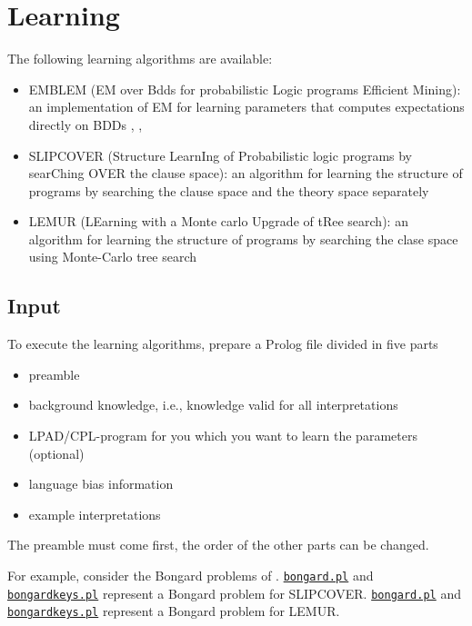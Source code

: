 \section{Learning}
\label{learning}
The following learning algorithms are available:
\begin{itemize}
\item EMBLEM (EM over Bdds for probabilistic Logic programs Efficient Mining): an implementation of EM for learning parameters that computes expectations directly on BDDs \cite{BelRig11-IDA-IJ}, \cite{BelRig11-CILC11-NC}, \cite{BelRig11-TR}
\item SLIPCOVER (Structure LearnIng of Probabilistic logic programs by searChing OVER the clause space): an algorithm for learning the structure of programs by searching the clause space and the theory space separately \cite{BelRig13-TPLP-IJ}
\item LEMUR (LEarning with a Monte carlo Upgrade of tRee search): an algorithm 
for learning the structure of programs by searching the clase space using 
Monte-Carlo tree search \cite{DiMBelRig15-ML-IJ}
\end{itemize}

\subsection{Input}
To execute the learning algorithms, prepare a Prolog file divided in five parts
\begin{itemize}
\item preamble
\item  background knowledge, i.e., knowledge valid for all interpretations
\item  LPAD/CPL-program for you which you want to learn the parameters (optional)
\item language bias information
\item  example interpretations 
\end{itemize}
The preamble must come first, the order of the other parts can be changed.

For example, consider the Bongard problems of \cite{RaeLae95-ALT95}. 
\href{http://cplint.eu/example/learning/bongard.pl}{\texttt{bongard.pl}} and \href{http://cplint.eu/example/learning/bongardkeys.pl}{\texttt{bongardkeys.pl}} represent a Bongard problem for SLIPCOVER.
\href{http://cplint.eu/example/lemur/bongard.pl}{\texttt{bongard.pl}} and \href{http://cplint.eu/example/lemur/bongardkeys.pl}{\texttt{bongardkeys.pl}} represent a Bongard problem for LEMUR.


